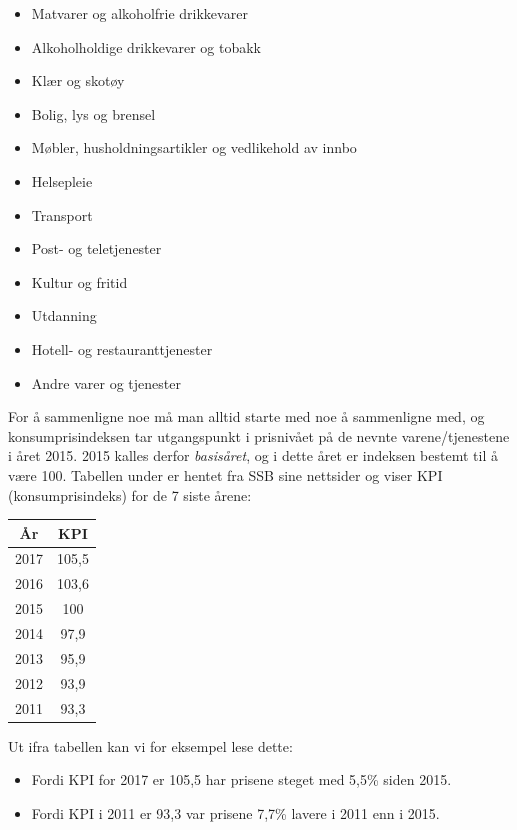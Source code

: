 \parbox[t]{0.49\linewidth}{\begin{itemize}
		\item Matvarer og alkoholfrie drikkevarer
		\item Alkoholholdige drikkevarer og tobakk
		\item Klær og skotøy
		\item Bolig, lys og brensel
		\item Møbler, husholdningsartikler og vedlikehold av innbo
		\item Helsepleie
\end{itemize}}
\parbox[t]{0.49\linewidth}{\begin{itemize}
		\item Transport
		\item Post- og teletjenester
		\item Kultur og fritid
		\item Utdanning
		\item Hotell- og restauranttjenester
		\item Andre varer og tjenester
\end{itemize}}
For å sammenligne noe må man alltid starte med noe å sammenligne med, og konsumprisindeksen tar utgangspunkt i prisnivået på de nevnte varene/tjenestene i året 2015. 2015 kalles derfor \textit{basisåret}, og i dette året er indeksen bestemt til å være 100.\regv
{}\regv
Tabellen under er hentet fra SSB sine nettsider og viser KPI (konsumprisindeks) for de 7 siste årene:
\begin{center}
	\begin{tabular}{c|c}
		År &  KPI \\ \hline
		2017&	105,5\\
		2016&	103,6\\
		2015&	100\\
		2014&	97,9\\
		2013&	95,9\\
		2012&	93,9\\
		2011&	93,3\\
	\end{tabular}
\end{center}
Ut ifra tabellen kan vi for eksempel lese dette:
\begin{itemize}
	\item Fordi KPI for 2017 er 105,5 har prisene steget med 5,5\% siden 2015.
	\item Fordi KPI i 2011 er 93,3 var prisene 7,7\% lavere i 2011 enn i 2015.
\end{itemize}
